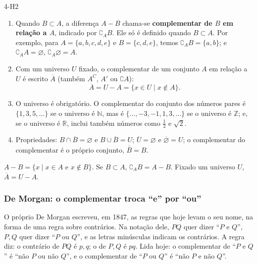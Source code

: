 \begin{construcao}[complementar]{4-H2}
\begin{enumerate}[label=(\arabic*)]
  \item Quando $B\subset A$, a diferença $A-B$ chama-se \textbf{complementar de $B$ em relação a $A$}, indicado por $\complement_A B$. Ele só é definido quando $B\subset A$. Por exemplo, para $A=\{a,b,c,d,e\}$ e $B=\{c,d,e\}$, temos $\complement_A B=\{a,b\}$; e $\complement_A A=\varnothing$, $\complement_A\varnothing=A$.
  \item Com um universo $U$ fixado, o complementar de um conjunto $A$ em relação a $U$ é escrito $\overline{A}$ (também $A^{C}$, $A'$ ou $\complement A$):
\[
\overline{A}=U-A=\{x\in U\mid x\notin A\}.
\]
  \item O universo é obrigatório. O complementar do conjunto dos números pares é $\{1,3,5,\ldots\}$ se o universo é $\mathbb{N}$, mas é $\{\ldots,-3,-1,1,3,\ldots\}$ se o universo é $\mathbb{Z}$; e, se o universo é $\mathbb{R}$, inclui também números como $\frac12$ e $\sqrt2$.
  \item Propriedades: $B\cap\overline{B}=\varnothing$ e $B\cup\overline{B}=U$; $\overline{U}=\varnothing$ e $\overline{\varnothing}=U$; o complementar do complementar é o próprio conjunto, $\overline{\overline{B}}=B$.
\end{enumerate}
\end{construcao}

\begin{definicao}
$A-B=\{x\mid x\in A\text{ e }x\notin B\}$. Se $B\subset A$, $\complement_A B=A-B$. Fixado um universo $U$, $\overline{A}=U-A$.
\end{definicao}

\subsubsection{De Morgan: o complementar troca \enquote{e} por \enquote{ou}}
O próprio De Morgan escreveu, em 1847, as regras que hoje levam o seu nome, na forma de uma regra sobre contrários. Na notação dele, $PQ$ quer dizer \enquote{$P$ e $Q$}, $P,Q$ quer dizer \enquote{$P$ ou $Q$}, e as letras minúsculas indicam os contrários. A regra diz: o contrário de $PQ$ é $p,q$; o de $P,Q$ é $pq$. Lida hoje: o complementar de \enquote{$P$ e $Q$} é \enquote{não $P$ ou não $Q$}, e o complementar de \enquote{$P$ ou $Q$} é \enquote{não $P$ e não $Q$}.

